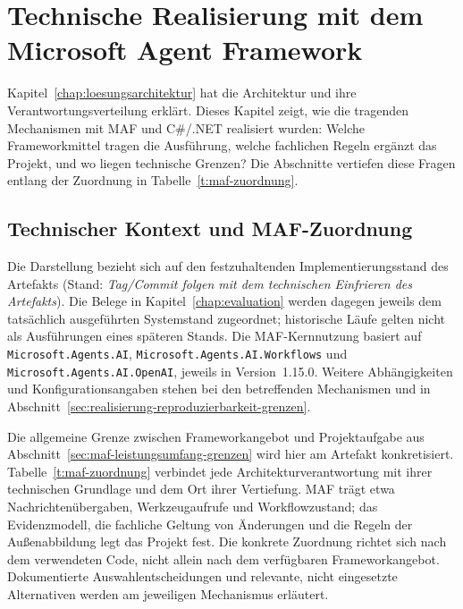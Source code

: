 \chapter{Technische Realisierung mit dem Microsoft Agent Framework}
\label{chap:maf-realisierung}

Kapitel~\ref{chap:loesungsarchitektur} hat die Architektur und ihre
Verantwortungsverteilung erklärt. Dieses Kapitel zeigt, wie die
tragenden Mechanismen mit MAF und C\#/.NET realisiert wurden:
Welche Frameworkmittel tragen die Ausführung, welche fachlichen
Regeln ergänzt das Projekt, und wo liegen technische Grenzen?
Die Abschnitte vertiefen diese Fragen entlang der Zuordnung in
Tabelle~\ref{t:maf-zuordnung}.

\section{Technischer Kontext und MAF-Zuordnung}
\label{sec:technischer-kontext-maf-zuordnung}

Die Darstellung bezieht sich auf den festzuhaltenden
Implementierungsstand des Artefakts
(Stand: \emph{Tag/Commit folgen mit dem technischen Einfrieren des
Artefakts}). Die Belege in Kapitel~\ref{chap:evaluation} werden
dagegen jeweils dem tatsächlich ausgeführten Systemstand
zugeordnet; historische Läufe gelten nicht als Ausführungen eines
späteren Stands. Die MAF-Kernnutzung basiert auf
\texttt{Microsoft.\allowbreak Agents.\allowbreak AI}, \texttt{Microsoft.\allowbreak Agents.\allowbreak AI.\allowbreak Workflows}
und \texttt{Microsoft.\allowbreak Agents.\allowbreak AI.\allowbreak OpenAI}, jeweils in Version~1.15.0.
Weitere Abhängigkeiten und Konfigurationsangaben stehen bei den
betreffenden Mechanismen und in
Abschnitt~\ref{sec:realisierung-reproduzierbarkeit-grenzen}.

Die allgemeine Grenze zwischen Frameworkangebot und Projektaufgabe
aus Abschnitt~\ref{sec:maf-leistungsumfang-grenzen} wird hier am
Artefakt konkretisiert. Tabelle~\ref{t:maf-zuordnung} verbindet jede
Architekturverantwortung mit ihrer technischen Grundlage und dem
Ort ihrer Vertiefung. MAF trägt etwa Nachrichtenübergaben,
Werkzeugaufrufe und Workflowzustand; das Evidenzmodell, die
fachliche Geltung von Änderungen und die Regeln der Außenabbildung
legt das Projekt fest. Die konkrete Zuordnung richtet sich nach
dem verwendeten Code, nicht allein nach dem verfügbaren
Frameworkangebot. Dokumentierte Auswahlentscheidungen und
relevante, nicht eingesetzte Alternativen werden am jeweiligen
Mechanismus erläutert.


